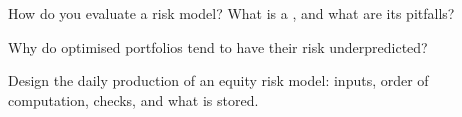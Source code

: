 \begin{interviewq}\label{iq:rs:risk-models:4}
How do you evaluate a risk model? What is a , and what are its pitfalls?
\end{interviewq}

\begin{interviewq}\label{iq:rs:risk-models:5}
Why do optimised portfolios tend to have their risk underpredicted?
\end{interviewq}

\begin{interviewq}\label{iq:rs:risk-models:6}
Design the daily production of an equity risk model: inputs, order of computation, checks, and what is stored.
\end{interviewq}
